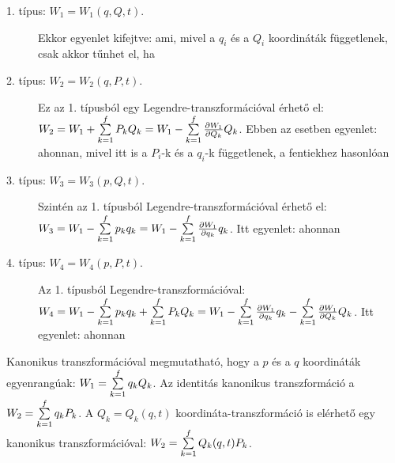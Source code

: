    \begin{description}
    \item[1. típus: $W_1=W_1(q,Q,t)$.]
     Ekkor  egyenlet kifejtve:
     ami, mivel a $q_i$ és a $Q_i$ koordináták függetlenek, csak akkor tűnhet el, ha 
    \item[2. típus: $W_2=W_2(q,P,t)$.]
     Ez az 1. típusból egy Legendre-transzformációval érhető el: $W_2=W_1+\sum\limits_{k=1}^{f}P_kQ_k=W_1-\sum\limits_{k=1}^{f}\frac{\partial W_1}{\partial Q_k}Q_k$. Ebben az esetben  egyenlet:
     ahonnan, mivel itt is a $P_i$-k és a $q_i$-k függetlenek, a fentiekhez hasonlóan 
    \item[3. típus: $W_3=W_3(p,Q,t)$.]
     Szintén az 1. típusból Legendre-transzformációval érhető el: $W_3=W_1-\sum\limits_{k=1}^{f}p_kq_k=W_1-\sum\limits_{k=1}^{f}\frac{\partial W_1}{\partial q_k}q_k$. Itt  egyenlet:
     ahonnan
    \item[4. típus: $W_4=W_4(p,P,t)$.]
     Az 1. típusból Legendre-transzformációval: $W_4=W_1-\sum\limits_{k=1}^{f}p_kq_k+\sum\limits_{k=1}^{f}P_kQ_k=W_1-\sum\limits_{k=1}^{f}\frac{\partial W_1}{\partial q_k}q_k-\sum\limits_{k=1}^{f}\frac{\partial W_1}{\partial Q_k}Q_k$. Itt  egyenlet:
     ahonnan
   \end{description}
   Kanonikus transzformációval megmutatható, hogy a $p$ és a $q$ koordináták egyenrangúak: $W_1=\sum\limits_{k=1}^{f}q_kQ_k$. Az identitás kanonikus transzformáció a $W_2=\sum\limits_{k=1}^{f}q_kP_k$. A $Q_k=Q_k(q,t)$ koordináta-transzformáció is elérhető egy kanonikus transzformációval: $W_2=\sum\limits_{k=1}^{f}Q_k(q,t)P_k$. 
   
